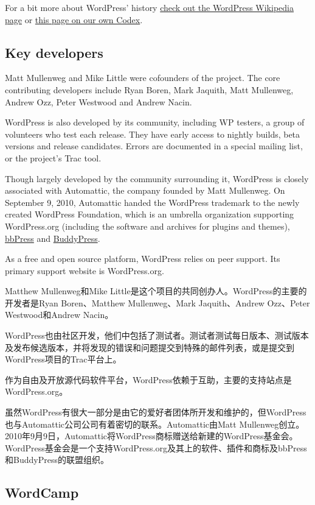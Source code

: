 For a bit more about WordPress' history \href{http://en.wikipedia.org/wiki/WordPress}{check out the WordPress Wikipedia page} or \href{http://codex.wordpress.org/History}{this page on our own Codex}.

\subsection{Key developers}

Matt Mullenweg and Mike Little were cofounders of the project. The core contributing developers include Ryan Boren, Mark Jaquith, Matt Mullenweg, Andrew Ozz, Peter Westwood and Andrew Nacin.

WordPress is also developed by its community, including WP testers, a group of volunteers who test each release. They have early access to nightly builds, beta versions and release candidates. Errors are documented in a special mailing list, or the project's Trac tool.

Though largely developed by the community surrounding it, WordPress is closely associated with Automattic, the company founded by Matt Mullenweg. On September 9, 2010, Automattic handed the WordPress trademark to the newly created WordPress Foundation, which is an umbrella organization supporting WordPress.org (including the software and archives for plugins and themes), \href{http://en.wikipedia.org/wiki/BbPress}{bbPress} and \href{http://en.wikipedia.org/wiki/BuddyPress}{BuddyPress}.

As a free and open source platform, WordPress relies on peer support. Its primary support website is WordPress.org.


Matthew Mullenweg和Mike Little是这个项目的共同创办人。WordPress的主要的开发者是Ryan Boren、Matthew Mullenweg、Mark Jaquith、Andrew Ozz、Peter Westwood和Andrew Nacin。

WordPress也由社区开发，他们中包括了测试者。测试者测试每日版本、测试版本及发布候选版本，并将发现的错误和问题提交到特殊的邮件列表，或是提交到WordPress项目的Trac平台上。

作为自由及开放源代码软件平台，WordPress依赖于互助，主要的支持站点是WordPress.org。

虽然WordPress有很大一部分是由它的爱好者团体所开发和维护的，但WordPress也与Automattic公司公司有着密切的联系。Automattic由Matt Mullenweg创立。2010年9月9日，Automattic将WordPress商标赠送给新建的WordPress基金会。WordPress基金会是一个支持WordPress.org及其上的软件、插件和商标及bbPress和BuddyPress的联盟组织。

\subsection{WordCamp}

